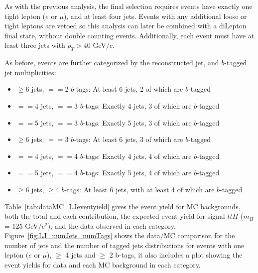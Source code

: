 \par As with the previous analysis, the final selection requires
events have exactly one tight lepton ($e$ or $\mu$), and at least four
jets. Events with any additional loose or tight leptons are vetoed so
this analysis can later be combined with a diLepton final state,
without double counting events. Additionally, each event must have at
least three jets with $p_{T} > 40$ GeV/c. 

\par As before, events are further categorized by the reconstructed jet, and
$b$-tagged jet multiplicities:

\begin{itemize}
  \item $\ge$6 jets,  $==$2 $b$-tags: At least 6 jets, 2 of which are $b$-tagged 
  \item $==$4 jets, $==$3 $b$-tags: Exactly 4 jets, 3 of which are $b$-tagged 
  \item $==$5 jets, $==$3 $b$-tags: Exactly 5 jets, 3 of which are $b$-tagged 
  \item $\ge$6 jets, $==$3 $b$-tags: At least 6 jets, 3 of which are $b$-tagged 
  \item $==$4 jets, $==$4 $b$-tags: Exactly 4 jets, 4 of which are $b$-tagged 
  \item $==$5 jets, $==$4 $b$-tags: Exactly 5 jets, 4 of which are $b$-tagged 
  \item $\ge$6 jets, $\ge$4 $b$-tags: At least 6 jets, with at least 4 of which are $b$-tagged 
\end{itemize}


\par Table~\ref{tab:dataMC_LJeventyield} gives the event yield for MC
backgrounds, both the total and each contribution, the expected event
yield for signal \(t\bar{t}H\) (\(m_{H}\) = 125 GeV/c$^2$), and the
data observed in each category. Figure~\ref{fig:LJ_numJets_numTags}
shows the data/MC comparison for the number of jets and the number of
tagged jets distributions for events with one lepton (\(e\) or
\(\mu\)), \(\ge\) 4 jets and \(\ge\) 2 b-tags, it also includes a plot
showing the event yields for data and each MC background in each
category. 


